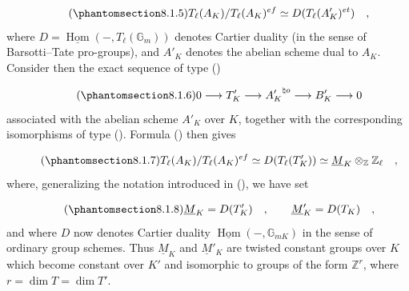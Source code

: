 \begin{equation}\tag{\SGARefTarget{sga7.sga7i.eix.n8-1-5}{8.1.5}}
T_\ell(A_K)/T_\ell(A_K)^{ef}
 \simeq D(T_\ell(A'_K)^{et}) \quad ,
\end{equation}
where $D=\underline{\operatorname{Hom}}(-,T_\ell(\mathbb{G}_m))$
denotes Cartier duality (in the sense of Barsotti--Tate
pro-groups), and $A'_K$ denotes the abelian scheme dual to $A_K$.
Consider then the exact sequence of type ()

\begin{equation}\tag{\SGARefTarget{sga7.sga7i.eix.n8-1-6}{8.1.6}}
0 \longrightarrow T'_K \longrightarrow {A'_K}^{\natural o}
 \longrightarrow B'_K \longrightarrow 0
\end{equation}
associated with the abelian scheme $A'_K$ over $K$, together with
the corresponding isomorphisms of type (). Formula ()
then gives

\begin{equation}\tag{\SGARefTarget{sga7.sga7i.eix.n8-1-7}{8.1.7}}
T_\ell(A_K)/T_\ell(A_K)^{ef}
 \simeq D(T_\ell(T'_K))
 \simeq \underline{M}_K\otimes_{\mathbb{Z}}\mathbb{Z}_\ell \quad ,
\end{equation}
where, generalizing the notation introduced in (), we have set

\begin{equation}\tag{\SGARefTarget{sga7.sga7i.eix.n8-1-8}{8.1.8}}
\underline{M}_K=D(T'_K) \quad , \qquad
\underline{M}'_K=D(T_K) \quad ,
\end{equation}
and where $D$ now denotes Cartier duality
$\underline{\operatorname{Hom}}(-,\mathbb{G}_{mK})$ in the sense of
ordinary group schemes. Thus $\underline{M}_K$ and
$\underline{M}'_K$ are twisted constant groups over $K$ which become
constant over $K'$ and isomorphic to groups of the form
$\mathbb{Z}^{r}$, where $r=\dim T=\dim T'$.

